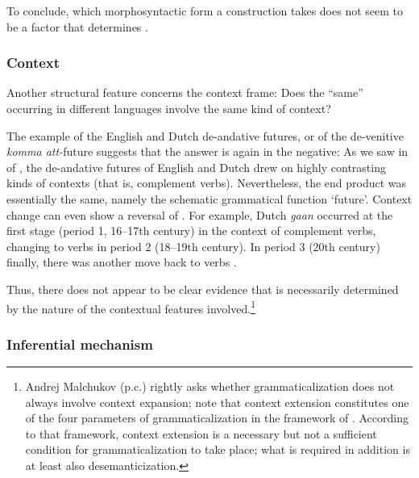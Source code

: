 \documentclass[output=paper]{langsci/langscibook}
\begin{document}
To conclude, which morphosyntactic form a construction takes does not seem to be a factor that determines .



\subsubsection{Context}\label{sec:heine:4.1.2}



Another structural feature concerns the context frame: Does the “same”  occurring in different languages involve the same kind of context?



  The example of the English and Dutch de-andative futures, or of the  de-venitive \textit{komma att-}future suggests that the answer is again in the negative: As we saw in  of , the de-andative futures of English and Dutch drew on highly contrasting kinds of contexts (that is, complement verbs). Nevertheless, the end product was essentially the same, namely the schematic grammatical function ‘future’. Context change can even show a reversal of . For example, Dutch \textit{gaan} occurred at the first stage (period 1, 16--17th century) in the context of  complement verbs, changing to  verbs in period 2 (18--19th century). In period 3 (20th century) finally, there was another move back to  verbs \citep[116--117]{Hilpert2008}. 



  Thus, there does not appear to be clear evidence that  is necessarily determined by the nature of the contextual features involved.\footnote{Andrej Malchukov (p.c.) rightly asks whether grammaticalization does not always involve context expansion; note that context extension constitutes one of the four parameters of grammaticalization in the framework of \citet[2]{Heine2002}. According to that framework, context extension is a necessary but not a sufficient condition for grammaticalization to take place; what is required in addition is at least also desemanticization. 
}



\subsubsection{Inferential mechanism}\label{sec:heine:4.1.3}
\end{document}
